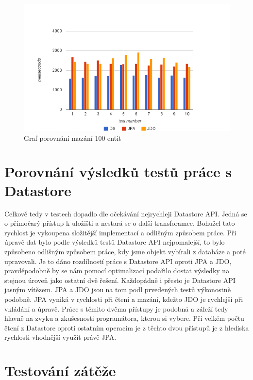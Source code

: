 \begin{figure}[h]
\begin{center}
\includegraphics[width=6.5in]{figures/delete.png}
\caption{Graf porovnání mazání 100 entit}
\label{fig:delete}
\end{center}
\end{figure}

\section{Porovnání výsledků testů práce s Datastore}
Celkově tedy v testech dopadlo dle očekávání nejrychleji Datastore API. Jedná se o přímočarý přístup k uložišti a nestará se o další transforamce. Bohužel tato rychlost je vykoupena složitější implementací a odlišným způsobem práce. Při úpravě dat bylo podle výsledků testů Datastore API nejpomalejší, to bylo způsobeno odlišným způsobem práce, kdy jsme objekt vybírali z databáze a poté upravovali. Je to dáno rozdílností práce s Datastore API oproti JPA a JDO, pravděpodobně by se nám pomocí optimalizací podařilo dostat výsledky na stejnou úroveň jako ostatní dvě řešení. Každopádně i přesto je Datastore API jasným vítězem. JPA a JDO jsou na tom podl prvedených testů výkonostně podobně. JPA vyniká v rychlosti při čtení a mazání, kdežto JDO je rychlejší při vkládání a úpravě. Práce s těmito dvěma přístupy je podobná a záleží tedy hlavně na zvyku a zkušesnosti programátora, kterou si vybere. Při velkém počtu čtení z Datastore oproti ostatním operacím je z těchto dvou přístupů je z hlediska rychlosti vhodnější využít právě JPA.


\section{Testování zátěže}

